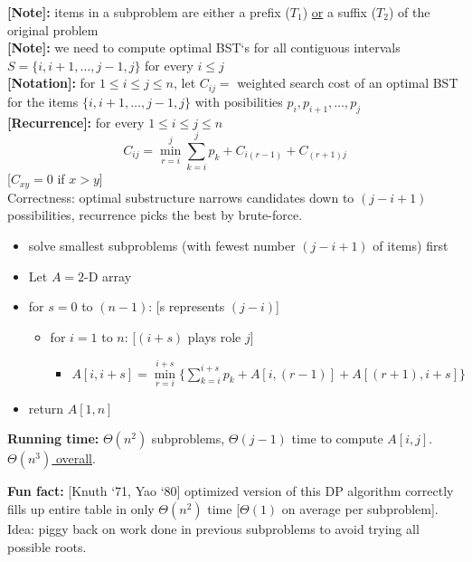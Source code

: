 \documentclass[a4paper,12pt]{article}
\theoremstyle{plain}
\theoremstyle{definition}
\theoremstyle{remark}
\begin{document}
\textbf{[Note]:} items in a subproblem are either a prefix ($T_1$) \underline{or} a suffix ($T_2$) of the original problem
\\

\textbf{[Note]:} we need to compute optimal BST`s for all contiguous intervals $S = \{i, i+1, \dots, j-1, j\}$ for every $i \leq j$
\\

\textbf{[Notation]:} for $1 \leq i \leq j \leq n$, let $C_{ij} =$ weighted search cost of an optimal BST for the items $\{i, i+1, \dots, j-1, j\}$ with posibilities $p_i, p_{i+1}, \dots, p_j$
\\

\textbf{[Recurrence]:} for every $1 \leq i \leq j \leq n$ \[C_{ij} = \min\limits_{r=i}^{j} \sum\limits_{k=i}^{j} p_k + C_{i(r-1)} + C_{(r+1)j}\]
[$C_{xy} = 0$ if $x > y$]
\\

Correctness: optimal substructure narrows candidates down to $(j - i + 1)$ possibilities, recurrence picks the best by brute-force.

\begin{itemize}
	\item solve smallest subproblems (with fewest number $(j-i+1)$ of items) first
	\item Let $A = 2$-D array
	\item for $s = 0$ to $(n-1)$: [s represents $(j-i)$]
	\begin{itemize}
		\item for $i = 1$ to $n$: [$(i+s)$ plays role $j$]
		\begin{itemize}
			\item $A[i, i+s] = \min\limits_{r=i}^{i+s} \{\sum\limits_{k=i}^{i+s} p_k + A[i,(r-1)] + A[(r+1),i+s]\}$
		\end{itemize}
	\end{itemize}
	\item return $A[1, n]$
\end{itemize}

\textbf{Running time:} $\Theta(n^2)$ subproblems, $\Theta(j-1)$ time to compute $A[i,j]$. \underline{$\Theta(n^3)$ overall}.

\textbf{Fun fact:} [Knuth `71, Yao `80] optimized version of this DP algorithm correctly fills up entire table in only $\Theta(n^2)$ time [$\Theta(1)$ on average per subproblem]. Idea: piggy back on work done in previous subproblems to avoid trying all possible roots.
\end{document}
